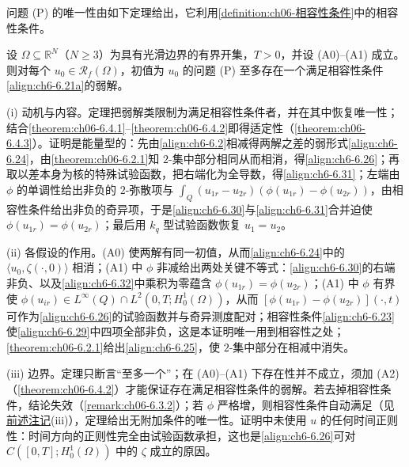 \documentclass[../../main.tex]{subfiles}%
\begin{document}
问题 (P) 的唯一性由如下定理给出，它利用\cref{definition:ch06-相容性条件}中的相容性条件。

\begin{theorem}\label{theorem:ch06-6.3.1}
设 $\Omega\subseteq\mathbb{R}^N$（$N\geqslant3$）为具有光滑边界的有界开集，$T>0$，并设 (A0)--(A1) 成立。则对每个 $u_0\in\mathscr{R}_f(\Omega)$，初值为 $u_0$ 的问题 (P) 至多存在一个满足相容性条件\eqref{align:ch6-6.21a}的弱解。
\end{theorem}

\begin{remark}\label{remark:ch06-唯一性动机}
(i) 动机与内容。定理把弱解类限制为满足相容性条件者，并在其中恢复唯一性；结合\cref{theorem:ch06-6.4.1}--\cref{theorem:ch06-6.4.2}即得适定性（\cref{theorem:ch06-6.4.3}）。证明是能量型的：先由\eqref{align:ch6-6.2}相减得两解之差的弱形式\eqref{align:ch6-6.24}，由\cref{theorem:ch06-6.2.1}知 $2$-集中部分相同从而相消，得\eqref{align:ch6-6.26}；再取以差本身为核的特殊试验函数，把右端化为全导数，得\eqref{align:ch6-6.31}；左端由 $\phi$ 的单调性给出非负的 $2$-弥散项与 $\int_Q(u_{1r}-u_{2r})(\phi(u_{1r})-\phi(u_{2r}))$，由相容性条件给出非负的奇异项，于是\eqref{align:ch6-6.30}与\eqref{align:ch6-6.31}合并迫使 $\phi(u_{1r})=\phi(u_{2r})$；最后用 $k_q$ 型试验函数恢复 $u_1=u_2$。

(ii) 各假设的作用。(A0) 使两解有同一初值，从而\eqref{align:ch6-6.24}中的 $\langle u_0,\zeta(\cdot,0)\rangle$ 相消；(A1) 中 $\phi$ 非减给出两处关键不等式：\eqref{align:ch6-6.30}的右端非负、以及\eqref{align:ch6-6.32}中乘积为零蕴含 $\phi(u_{1r})=\phi(u_{2r})$；(A1) 中 $\phi$ 有界使 $\phi(u_{ir})\in L^\infty(Q)\cap L^2(0,T;H^1_0(\Omega))$，从而 $[\phi(u_{1r})-\phi(u_{2r})](\cdot,t)$ 可作为\eqref{align:ch6-6.26}的试验函数并与奇异测度配对；相容性条件\eqref{align:ch6-6.23}使\eqref{align:ch6-6.29}中四项全部非负，这是本证明唯一用到相容性之处；\cref{theorem:ch06-6.2.1}给出\eqref{align:ch6-6.25}，使 $2$-集中部分在相减中消失。

(iii) 边界。定理只断言“至多一个”；在 (A0)--(A1) 下存在性并不成立，须加 (A2)（\cref{theorem:ch06-6.4.2}）才能保证存在满足相容性条件的弱解。若去掉相容性条件，结论失效（\cref{remark:ch06-6.3.2}）；若 $\phi$ 严格增，则相容性条件自动满足（见\hyperref[remark:ch06-相容动机]{前述注记}(iii)），定理给出无附加条件的唯一性。证明中未使用 $u$ 的任何时间正则性：时间方向的正则性完全由试验函数承担，这也是\eqref{align:ch6-6.26}可对 $C([0,T];H^1_0(\Omega))$ 中的 $\zeta$ 成立的原因。
\end{remark}
\end{document}
